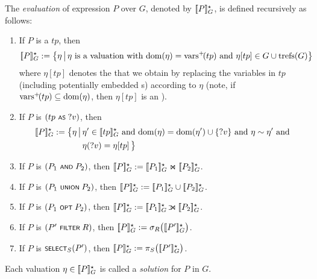 \noindent
%
	The \emph{evaluation} of {\SPARQLplus} expression $P$ over {\RDFplusGraph} $G$,
denoted by $[\![P]\!]^\star_{G}$, is defined recursively as follows:
\begin{enumerate}
	\item If $P$ is a {\TPplus} $tp$, then
		\begin{equation*}
			[\![P]\!]^\star_{G} := \big\lbrace \eta \,\big|\,
				\eta \text{ is a valuation with } \mathrm{dom}(\eta) = \mathrm{vars}^+\!(tp)
				\text{ and } \eta[tp] \in G \cup \mathrm{trefs}(G)
			\big\rbrace
		\end{equation*}
		where $\eta[tp]$ denotes the {\TPplus} that we obtain by replacing the variables in $tp$ (including potentially embedded {\TPplus}s) according to $\eta$ (note, if $\mathrm{vars}^+\!(tp) \subseteq \mathrm{dom}(\eta)$, then $\eta[tp]$ is an {\RDFplusTriple}).
		\vspace{1ex} %
	\item If $P$ is $(tp \text{ \normalfont\scriptsize\textsf{AS} } ?v)$, then
		\begin{align*}
			\fctEvalPlus{P}{G} := \big\lbrace \eta \,\big|\,
				& \eta' \in \fctEvalPlus{tp}{G} 
				\text{ and } %
					\fctDom{\eta} = \fctDom{\eta'}\cup \lbrace ?v \rbrace
				\text{ and } \eta \compatible \eta' \text{ and }\\
				& \eta(?v) = \eta[tp] \,
			\big\rbrace
		\end{align*}
	\item If $P$ is $(P_1 \text{ \normalfont\scriptsize\textsf{AND} } P_2)$, then $[\![P]\!]^\star_{G} := [\![P_1]\!]^\star_{G} \Join [\![P_2]\!]^\star_{G}$.
	\item If $P$ is $(P_1 \text{ \normalfont\scriptsize\textsf{UNION} } P_2)$, then $[\![P]\!]^\star_{G} := [\![P_1]\!]^\star_{G} \cup [\![P_2]\!]^\star_{G}$.
	\item If $P$ is $(P_1 \text{ \normalfont\scriptsize\textsf{OPT} } P_2)$, then $\fctEvalPlus{P}{G} := \fctEvalPlus{P_1}{G} \LJoin \fctEvalPlus{P_2}{G}$.
	\item If $P$ is $(P' \text{ \normalfont\scriptsize\textsf{FILTER} } R)$, then $[\![P]\!]^\star_{G} := \sigma_R\bigl( [\![P']\!]^\star_{G} \bigr)$.
	\item If $P$ is $\text{\normalfont\scriptsize\textsf{SELECT}}_S(P')$, then $[\![P]\!]^\star_{G} := \pi_S\bigl( [\![P']\!]^\star_{G} \bigr)$.
\end{enumerate}
Each valuation $\eta \in [\![P]\!]^\star_{G}$ is called a \emph{solution} for $P$ in $G$.

